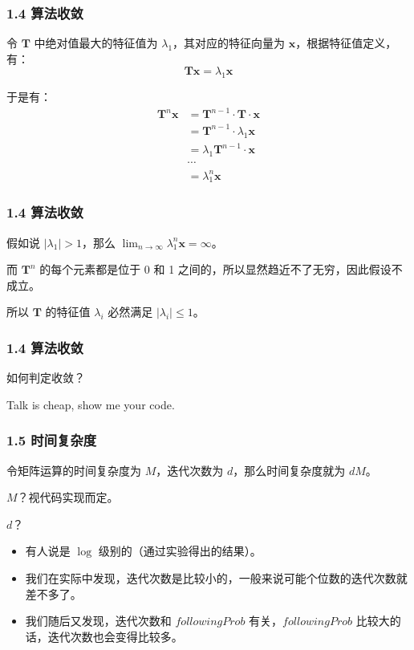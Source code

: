 \documentclass{beamer}
\begin{document}
\begin{frame}
	\frametitle{1.4 算法收敛}
	令 \(\mathbf{T}\) 中绝对值最大的特征值为 \(\lambda_1\)，其对应的特征向量为 \(\mathbf{x}\)，根据特征值定义，有：
	\[
	\mathbf{T}\mathbf{x} = \lambda_1\mathbf{x}
	\]

	\pause

	于是有：
	\begin{align*}
	\mathbf{T}^n\mathbf{x}
	&= \mathbf{T}^{n-1}\cdot \mathbf{T} \cdot \mathbf{x} \\
	&= \mathbf{T}^{n-1}\cdot \lambda_1 \mathbf{x} \\
	&= \lambda_1 \mathbf{T}^{n-1}\cdot  \mathbf{x} \\
	&\cdots \\
	&=\lambda_1^n\mathbf{x}
	\end{align*}
\end{frame}

\begin{frame}
	\frametitle{1.4 算法收敛}
	假如说 \(|\lambda_1|>1\)，那么 \(\lim_{n\rightarrow \infty}\lambda_1^n\mathbf{x} = \infty\)。

	\pause
	
	而 \(\mathbf{T}^n\) 的每个元素都是位于 0 和 1 之间的，所以显然趋近不了无穷，因此假设不成立。

	\pause

	所以 \(\mathbf{T}\) 的特征值 \(\lambda_i\) 必然满足 \(|\lambda_i|\le 1\)。
\end{frame}

\begin{frame}
	\frametitle{1.4 算法收敛}
	如何判定收敛？

	\pause
	
	Talk is cheap, show me your code.
\end{frame}

\begin{frame}
	\frametitle{1.5 时间复杂度}
	令矩阵运算的时间复杂度为 \(M\)，迭代次数为 \(d\)，那么时间复杂度就为 \(dM\)。 \pause

	\(M\)？视代码实现而定。 \pause

	\(d\)？

	\pause

	\begin{itemize}
		\item 有人说是 \(\log\) 级别的（通过实验得出的结果）。 \pause
		\item 我们在实际中发现，迭代次数是比较小的，一般来说可能个位数的迭代次数就差不多了。 \pause
		\item 我们随后又发现，迭代次数和 \(followingProb\) 有关，\(followingProb\) 比较大的话，迭代次数也会变得比较多。
	\end{itemize}
\end{frame}
\end{document}
